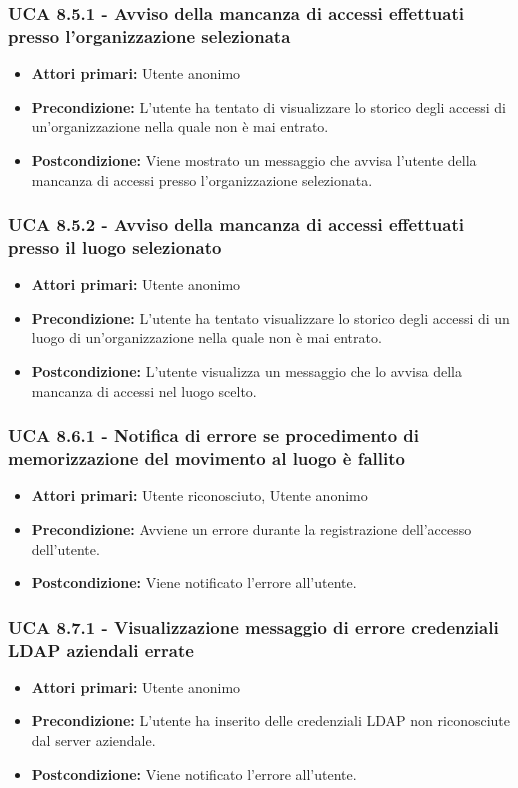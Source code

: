 \subsubsection{UCA 8.5.1 - Avviso della mancanza di accessi effettuati presso l'organizzazione selezionata}
\begin{itemize}
    \item \textbf{Attori primari:} Utente anonimo
    \item \textbf{Precondizione:} L'utente ha tentato di visualizzare lo storico degli accessi di un'organizzazione nella quale non è mai entrato.
    \item \textbf{Postcondizione:} Viene mostrato un messaggio che avvisa l'utente della mancanza di accessi presso l'organizzazione selezionata.
\end{itemize}

\subsubsection{UCA 8.5.2 - Avviso della mancanza di accessi effettuati presso il luogo selezionato}
\begin{itemize}
    \item \textbf{Attori primari:} Utente anonimo
    \item \textbf{Precondizione:} L'utente ha tentato visualizzare lo storico degli accessi di un luogo di un'organizzazione nella quale non è mai entrato.
    \item \textbf{Postcondizione:} L'utente visualizza un messaggio che lo avvisa della mancanza di accessi nel luogo scelto.
\end{itemize}

\subsubsection{UCA 8.6.1 - Notifica di errore se procedimento di memorizzazione del movimento al luogo è fallito}
\begin{itemize}
	\item \textbf{Attori primari:} Utente riconosciuto, Utente anonimo
	\item \textbf{Precondizione:} Avviene un errore durante la registrazione dell'accesso dell'utente.
	\item \textbf{Postcondizione:} Viene notificato l'errore all'utente.
\end{itemize}

\subsubsection{UCA 8.7.1 - Visualizzazione messaggio di errore credenziali LDAP aziendali errate}
\begin{itemize}
	\item \textbf{Attori primari:} Utente anonimo
	\item \textbf{Precondizione:} L'utente ha inserito delle credenziali LDAP non riconosciute dal server aziendale.
	\item \textbf{Postcondizione:} Viene notificato l'errore all'utente.
\end{itemize}